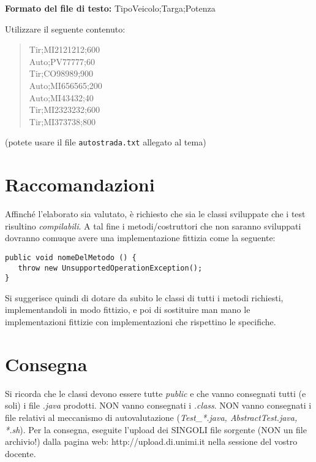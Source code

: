 \documentclass[a4paper]{article}
\begin{document}
\textbf{Formato del file di testo:}  TipoVeicolo;Targa;Potenza

Utilizzare il seguente contenuto:

\begin{quote}
Tir;MI2121212;600\\
Auto;PV77777;60\\
Tir;CO98989;900\\
Auto;MI656565;200\\
Auto;MI43432;40\\
Tir;MI2323232;600\\
Tir;MI373738;800
\end{quote}

(potete usare il file \texttt{autostrada.txt} allegato al tema)

\hrulefill
\section*{Raccomandazioni}

Affinché l'elaborato sia valutato, è richiesto che sia le classi sviluppate che i test risultino
\textit{compilabili}. A tal fine i metodi/costruttori che non saranno sviluppati dovranno comuque avere
una implementazione fittizia come la seguente:
\begin{verbatim}
public void nomeDelMetodo () {
   throw new UnsupportedOperationException();
}
\end{verbatim}
Si suggerisce quindi di dotare da subito le classi di tutti i metodi richiesti, 
implementandoli in modo fittizio, e poi di sostituire man mano le 
implementazioni fittizie con implementazioni che rispettino le specifiche.

\hrulefill

\section*{Consegna}
Si ricorda che le classi devono essere tutte \textit{public} e che vanno 
consegnati tutti (e soli) i file \textit{.java} prodotti.
NON vanno consegnati i \textit{.class}.
NON vanno consegnati i file relativi al meccanismo di autovalutazione 
(\textit{Test\_*.java, AbstractTest.java, *.sh}).
Per la consegna, eseguite l'upload dei SINGOLI file sorgente (NON un file archivio!) dalla pagina web: http://upload.di.unimi.it
nella sessione del vostro docente.
\end{document}

